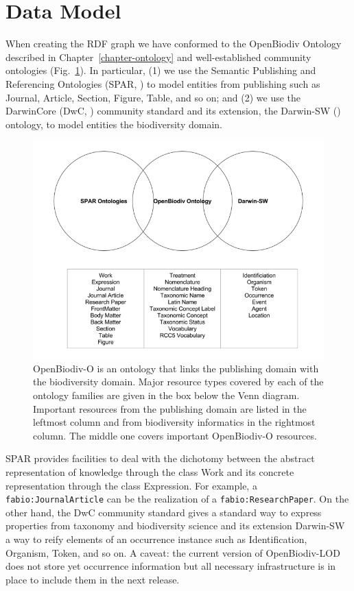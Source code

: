 \section{Data Model}

When creating the RDF graph we have conformed to the OpenBiodiv Ontology described in Chapter~\ref{chapter-ontology} and well-established community ontologies (Fig.~\ref{fig:community-ontologies}). In particular, (1) we use the Semantic Publishing and Referencing Ontologies (SPAR, \cite{peroni_semantic_2014}) to model entities from publishing such as Journal, Article, Section, Figure, Table, and so on; and (2) we use the DarwinCore (DwC, \cite{wieczorek_darwin_2012}) community standard and its extension, the Darwin-SW (\cite{baskauf_darwin-sw:_2016}) ontology, to model entities the biodiversity domain.

\begin{figure}
\centering
\includegraphics[width=\textwidth]{Figures/community-ontologies}
\decoRule
\caption[Overlap of OpenBiodiv-O with Community Ontologies]{OpenBiodiv-O is an ontology that links the publishing domain with the biodiversity domain. Major resource types covered by each of the ontology families are given in the box below the Venn diagram. Important resources from the publishing domain are listed in the leftmost column and from biodiversity informatics in the rightmost column. The middle one covers important OpenBiodiv-O resources.}
\label{fig:community-ontologies}
\end{figure}

SPAR provides facilities to deal with the dichotomy between the abstract representation of knowledge through the class Work and its concrete representation through the class Expression. For example, a {\tt fabio:JournalArticle} can be the realization of a {\tt fabio:ResearchPaper}. On the other hand, the DwC community standard gives a standard way to express properties from taxonomy and biodiversity science and its extension Darwin-SW a way to reify elements of an occurrence instance such as Identification, Organism, Token, and so on. A caveat: the current version of OpenBiodiv-LOD does not store yet occurrence information but all necessary infrastructure is in place to include them in the next release.

